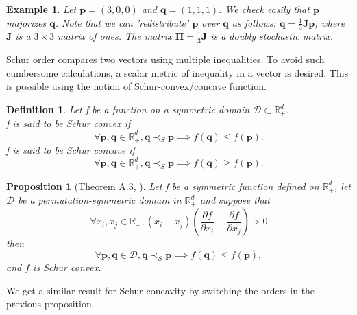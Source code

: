 \documentclass[twoside,11pt]{book}
\newtheorem{theorem}{Theorem}
\newtheorem{proposition}{Proposition}
\newtheorem{definition}{Definition}
\newtheorem{example}{Example}
\numberwithin{theorem}{chapter}
\numberwithin{definition}{chapter}
\numberwithin{proposition}{chapter}
\numberwithin{corollary}{chapter}
\numberwithin{example}{chapter}
\numberwithin{lemma}{chapter}
\numberwithin{assumption}{chapter}
\DeclareMathOperator{\Fr}{\mathrm{Fr}}
\DeclareMathOperator{\VS}{\mathrm{VS}}
\begin{document}
\begin{example}
Let $\bm{p} = (3,0,0)$ and $\bm{q} = (1,1,1)$.
We check easily that $\bm{p}$ majorizes $\bm{q}$. Note that we can 'redistribute' $\bm{p}$ over $\bm{q}$ as follows: $\bm{q} =\frac{1}{3} \bm{J} \bm{p}$, where $\bm{J}$ is a $3 \times 3$ matrix of ones. The matrix $\bm{\Pi}=\frac{1}{3}\bm{J}$ is a doubly stochastic matrix.
\end{example}
Schur order compares two vectors using multiple inequalities. To avoid such cumbersome calculations, a scalar metric of inequality in a vector is desired. This is possible using the notion of Schur-convex/concave function.

\begin{definition}
Let f be a function on a symmetric domain $\mathcal{D} \subset \mathbb{R}_{+}^{d}$.\\
f is said to be Schur convex if
\begin{equation}
    \forall \bm{p}, \bm{q} \in \mathbb{R}_{+}^{d}, \bm{q} \prec_{S} \bm{p} \implies f(\bm{q}) \leq f(\bm{p}).
\end{equation}
f is said to be Schur concave if
\begin{equation}
    \forall \bm{p}, \bm{q} \in \mathbb{R}_{+}^{d}, \bm{q} \prec_{S} \bm{p} \implies f(\bm{q}) \geq f(\bm{p}).
\end{equation}
\end{definition}


\begin{proposition}[Theorem A.3, \citealp{MaOlAr11}]\label{schur_order_partial_property}
Let f be a symmetric function defined on $\mathbb{R}_{+}^{d}$, let $\mathcal{D}$ be a permutation-symmetric domain in $\mathbb{R}_{+}^{d}$ and suppose that
\begin{equation}
\forall x_{i},x_{j} \in \mathbb{R}_{+},   (x_{i} - x_{j}) (\frac{\partial f}{\partial x_{i}} - \frac{\partial f}{\partial x_{j}}) >0 
\end{equation}
then
\begin{equation}
    \forall \bm{p}, \bm{q} \in \mathcal{D}, \bm{q} \prec_{S} \bm{p} \implies f(\bm{q}) \leq f(\bm{p}),
\end{equation}
and $f$ is Schur convex.
\end{proposition}
We get a similar result for Schur concavity by switching the orders in the previous proposition. 

\end{document}
